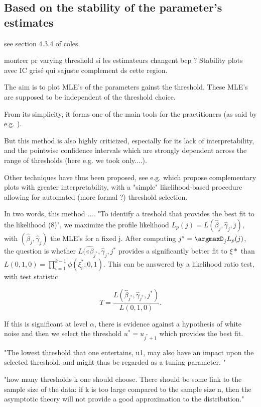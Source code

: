 \subsection*{Based on the stability of the parameter's estimates}
see section 4.3.4 of coles.

montrer pr varying threshold si les estimateurs changent bcp ?  Stability plots avec IC grisé qui sajuste complement ds cette region.

The aim is to plot MLE's of the parameters gainst the threshold. These MLE's are supposed to be independent of the threshold choice. 

From its simplicity, it forms one of the main tools for the practitioners (as said by e.g. \citet{} ).

But this method is also highly criticized, especially for its lack of interpretability, and the pointwise confidence intervals which are strongly dependent across the range of thresholds (here e.g. we took only....).

Other techniques have thus been proposed, see e.g. \citet{Wadsworth_exploiting_2016} which propose complementary plots with greater interpretability, with a "simple" likelihood-based procedure allowing for automated (more formal ?) threshold selection.

In two words, this method ....
"To identify a treshold that provides the best fit to the likelihood (8)", we maximize the profile likelihood $L_p(j)=L(\hat{\beta}_j,\hat{\gamma}_j,j)$, with $(\hat{\beta}_j,\hat{\gamma}_j)$ the MLE's for a fixed j. After computing $j^*=\argmaxD_j L_p(j)$, the question is whether $L(\hat{«\beta}_{j^*},\hat{\gamma}_j,j^*$ provides a significantly better fit to $\xi*$ than $L(0,1,0)=\prod_{i=1}^{k-1}\phi(\xi_i^*;0,1)$. This can be answered by a likelihood ratio test, with test statistic 

\begin{equation}
T=\frac{L(\hat{\beta}_{j^*},\hat{\gamma}_{j^*},j^*)}{L(0,1,0)}.
\end{equation}

If this is significant at level $\alpha$, there is evidence against a hypothesis of white noise and then we select the threshold $u^*=u_{j^*+1}$ which provides the best fit.

"The lowest threshold that one entertains, u1, may also
have an impact upon the selected threshold, and might thus be
regarded as a tuning parameter. "

"how many thresholds k one
should choose. There should be some link to the sample size of
the data: if k is too large compared to the sample size n, then the
asymptotic theory will not provide a good approximation to the
distribution."



